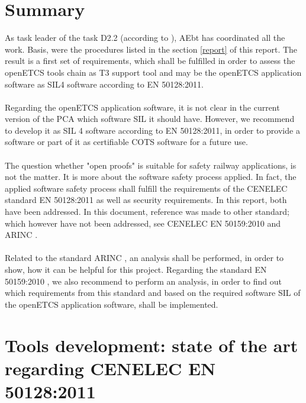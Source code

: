 \documentclass{template/openetcs_report}
\begin{document}
\chapter{Summary}
As task leader of the task D2.2 (according to \cite{FPP13}), AEbt has coordinated all the work. Basis, were the procedures listed in the section \ref{report} of this report. The result is a first set of requirements, which shall be fulfilled in order to assess the openETCS tools chain as T3 support tool and may be the openETCS application software as SIL4 software according to EN 50128:2011. \\\\Regarding the openETCS application software, it is not clear in the current version of the PCA \cite{PCA12} which software SIL it should have. However, we recommend to develop it as SIL 4 software according to EN 50128:2011, in order to provide a software or part of it as certifiable COTS software for a future use.\\\\
The question whether "open proofs" is suitable for safety railway applications, is not the matter. It is more about the software safety process applied. In fact, the applied software safety process shall fulfill the requirements of the CENELEC standard EN 50128:2011 as well as security requirements. In this report, both have been addressed.
In this document, reference was made to other standard; which however have not been addressed, see CENELEC EN 50159:2010 \cite{EN50159} and ARINC \cite{ARINC}.\\\\
Related to the standard ARINC \cite{ARINC}, an analysis shall be performed, in order to show, how it can be helpful for this project. Regarding the standard EN 50159:2010 \cite{EN50159}, we also recommend to perform an analysis, in order to find out which requirements from this standard and based on the required software SIL of the openETCS application software, shall be implemented.





\nocite{*}




\appendix

\chapter{Tools development: state of the art regarding CENELEC EN 50128:2011}
\label{annexA}
\end{document}
